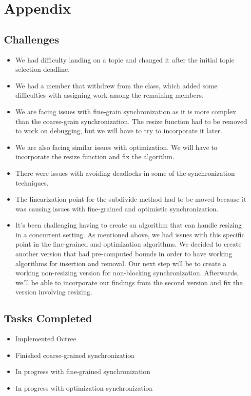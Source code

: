 \documentclass[conference]{IEEEtran}
\begin{document}
\section*{Appendix}
\subsection*{Challenges}
\begin{itemize}
    \item We had difficulty landing on a topic and changed it after the initial topic selection deadline.
    \item We had a member that withdrew from the class, which added some difficulties with assigning work among the remaining members.
    \item We are facing issues with fine-grain synchronization as it is more complex than the coarse-grain synchronization. The resize function had to be removed to work on debugging, but we will have to try to incorporate it later.
    \item We are also facing similar issues with optimization. We will have to incorporate the resize function and fix the algorithm.
    \item There were issues with avoiding deadlocks in some of the synchronization techniques.
    \item The linearization point for the subdivide method had to be moved because it was causing issues with fine-grained and optimistic synchronization.
    \item It's been challenging having to create an algorithm that can handle resizing in a concurrent setting. As mentioned above, we had issues with this specific point in the fine-grained and optimization algorithms. We decided to create another version that had pre-computed bounds in order to have working algorithms for insertion and removal. Our next step will be to create a working non-resizing version for non-blocking synchronization. Afterwards, we'll be able to incorporate our findings from the second version and fix the version involving resizing.
\end{itemize}
\subsection*{Tasks Completed}
\begin{itemize}
    \item Implemented Octree
    \item Finished coarse-grained synchronization
    \item In progress with fine-grained synchronization
    \item In progress with optimization synchronization
\end{itemize}
    
\end{document}

